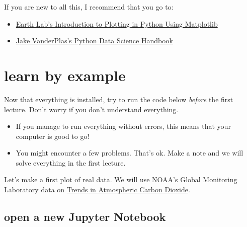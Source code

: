 \documentclass[
  letterpaper,
  DIV=11,
  numbers=noendperiod,
  oneside]{scrreprt}
\providecommand{\tightlist}{%
  \setlength{\itemsep}{0pt}\setlength{\parskip}{0pt}}\usepackage{longtable,booktabs,array}
\begin{document}
If you are new to all this, I recommend that you go to:

\begin{itemize}
\tightlist
\item
  \href{https://www.earthdatascience.org/courses/scientists-guide-to-plotting-data-in-python/plot-with-matplotlib/introduction-to-matplotlib-plots/}{Earth
  Lab's Introduction to Plotting in Python Using Matplotlib}
\item
  \href{https://jakevdp.github.io/PythonDataScienceHandbook/index.html}{Jake
  VanderPlas's Python Data Science Handbook}
\end{itemize}

\hypertarget{learn-by-example}{%
\chapter{learn by example}\label{learn-by-example}}

Now that everything is installed, try to run the code below
\emph{before} the first lecture. Don't worry if you don't understand
everything.

\begin{itemize}
\tightlist
\item
  If you manage to run everything without errors, this means that your
  computer is good to go!
\item
  You might encounter a few problems. That's ok. Make a note and we will
  solve everything in the first lecture.
\end{itemize}

Let's make a first plot of real data. We will use NOAA's Global
Monitoring Laboratory data on
\href{https://gml.noaa.gov/ccgg/trends/data.html}{Trends in Atmospheric
Carbon Dioxide}.

\hypertarget{open-a-new-jupyter-notebook}{%
\section{open a new Jupyter
Notebook}\label{open-a-new-jupyter-notebook}}
\end{document}
